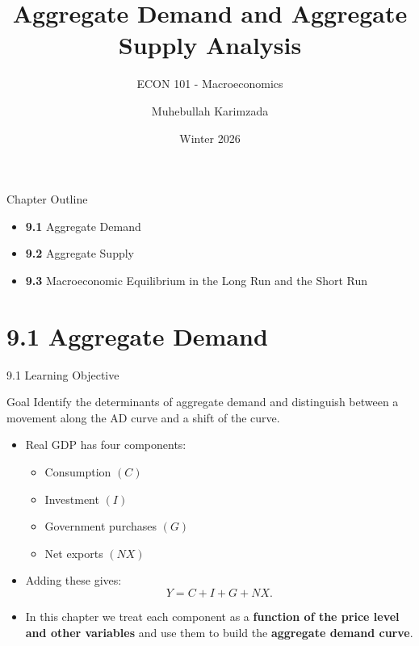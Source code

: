 \documentclass[aspectratio=169]{beamer}
\title{\textbf{Aggregate Demand and Aggregate Supply Analysis \vspace{.5cm}\\  }}
\subtitle{ {\large ECON 101 - Macroeconomics}}
\author{Muhebullah Karimzada}
\date{Winter 2026}
\begin{document}
\begin{frame}[plain]
  \titlepage
\end{frame}

\begin{frame}{Chapter Outline}
\transfade
\begin{itemize}[<+->]
  \item \textbf{9.1} Aggregate Demand
  \item \textbf{9.2} Aggregate Supply
  \item \textbf{9.3} Macroeconomic Equilibrium in the Long Run and the Short Run
\end{itemize}
\end{frame}

\section{9.1 Aggregate Demand}

\begin{frame}{9.1 Learning Objective}
\transfade
\begin{block}{Goal}
Identify the determinants of aggregate demand and distinguish between a movement along the AD curve and a shift of the curve.
\end{block}
\begin{itemize}[<+->]
  \item Real GDP has four components:
  \begin{itemize}[<+->]
    \item Consumption \((C)\)
    \item Investment \((I)\)
    \item Government purchases \((G)\)
    \item Net exports \((NX)\)
  \end{itemize}
  \item Adding these gives:
  \[
    Y = C + I + G + NX.
  \]
  \item In this chapter we treat each component as a \textbf{function of the price level and other variables} and use them to build the \textbf{aggregate demand curve}.
\end{itemize}
\end{frame}
\end{document}
